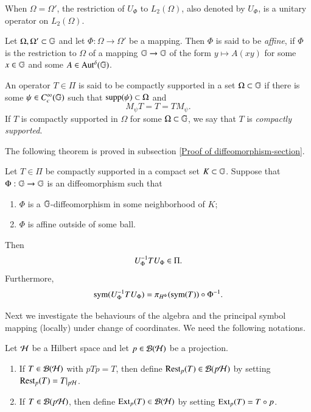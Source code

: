 \documentclass[leqno]{amsart}
\begin{document}
	When $\Omega=\Omega'$, the restriction of $U_{\Phi}$ to $L_2(\Omega)$, also denoted by $U_\Phi$, is a unitary operator on $L_{2}(\Omega)$.
	
	
	
	\begin{definition}
		Let $\Omega,\Omega'\subset\mathbb{G}$ and let $\Phi:\Omega\to\Omega'$ be a mapping. Then $\Phi$ is said to be \textit{affine}, if $\Phi$ is the restriction to $\Omega$ of a mapping $\mathbb{G}\to\mathbb{G}$ of the form $y\mapsto A(xy)$ for some $x\in\mathbb{G}$ and some $A\in{\rm Aut^{\delta}}(\mathbb{G})$.
	\end{definition}
	
	\begin{definition}
		An operator $T\in\Pi$ is said to be compactly supported in a set $\Omega\subset\mathbb{G}$ if there is some $\psi\in C_{c}^{\infty}(\mathbb{G})$ such that ${\rm supp}(\psi)\subset \Omega$ and
		$$M_\psi T=T=TM_\psi.$$
		If $T$ is compactly supported in $\Omega$ for some $\Omega\subset\mathbb{G}$, we say that $T$ is \textit{compactly supported}.
	\end{definition}
	The following theorem is proved in subsection \ref{Proof of diffeomorphism-section}. 
	\begin{theorem}\label{diffeomorphism}
		Let $T\in\Pi$ be compactly supported in a compact set $K\subset\mathbb{G}$. 
		Suppose that $\Phi:\mathbb{G}\to\mathbb{G}$ is an diffeomorphism such that
		\begin{enumerate}[\rm(1)]
			\item $\Phi$ is a $\mathbb{G}$-diffeomorphism in some neighborhood of $K$;
			
			\item $\Phi$ is affine outside of some ball.
		\end{enumerate}
		Then
		\begin{align*}
			U_{\Phi}^{-1} T U_{\Phi}\in\Pi.
		\end{align*}
		Furthermore,
		\begin{align*}
			{\rm sym}(U_{\Phi}^{-1} T U_{\Phi})=\pi_{H^{\Phi}}({\rm sym}(T))\circ\Phi^{-1}.
		\end{align*}
	\end{theorem}
	
	
	
	
	
	Next we investigate the behaviours of the algebra and the principal symbol mapping (locally) under change of coordinates. We need the following notations.
	\begin{definition}
		Let ${\mathcal H}$ be a Hilbert space and let $p\in{\mathcal B}({\mathcal H})$ be a projection.
		\begin{enumerate}[\rm(1)]
			\item If $T\in{\mathcal B}({\mathcal H})$ with $pTp=T$, then define ${\rm Rest}_{p}(T)\in{\mathcal B}(p{\mathcal H})$ by setting ${\rm Rest}_{p}(T)=T|_{p{\mathcal H}}$. 
			\item If $T\in{\mathcal B}(p{\mathcal H})$, then define ${\rm Ext}_{p}(T)\in{\mathcal B}({\mathcal H})$ by setting ${\rm Ext}_{p}(T)=T\circ p$.
		\end{enumerate}
	\end{definition}
	
\end{document}
